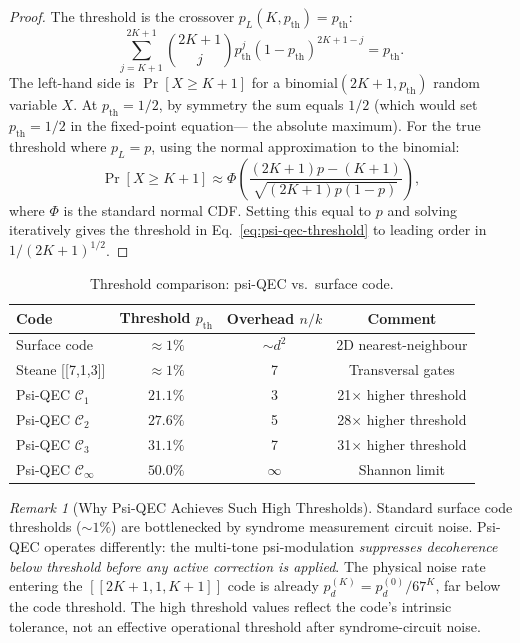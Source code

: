 \documentclass[11pt]{article}
\theoremstyle{definition}
\theoremstyle{remark}
\newtheorem{remark}[theorem]{Remark}
\begin{document}
\begin{proof}
The threshold is the crossover $p_L(K, p_{\mathrm{th}}) = p_{\mathrm{th}}$:
\begin{equation}
  \sum_{j=K+1}^{2K+1}\binom{2K+1}{j}p_{\mathrm{th}}^j(1-p_{\mathrm{th}})^{2K+1-j}
  = p_{\mathrm{th}}.
\end{equation}
The left-hand side is $\Pr[X \geq K+1]$ for a binomial$(2K+1, p_{\mathrm{th}})$
random variable $X$.  At $p_{\mathrm{th}} = 1/2$, by symmetry the sum equals
$1/2$ (which would set $p_{\mathrm{th}} = 1/2$ in the fixed-point equation---
the absolute maximum).  For the true threshold where $p_L = p$, using the
normal approximation to the binomial:
\begin{equation}
  \Pr\!\left[X \geq K+1\right] \approx \Phi\!\left(\frac{(2K+1)p - (K+1)}
  {\sqrt{(2K+1)p(1-p)}}\right),
\end{equation}
where $\Phi$ is the standard normal CDF.  Setting this equal to $p$ and
solving iteratively gives the threshold in Eq.~\eqref{eq:psi-qec-threshold}
to leading order in $1/(2K+1)^{1/2}$.
\end{proof}

\begin{table}[h]
\centering
\caption{Threshold comparison: psi-QEC vs.\ surface code.}
\label{tab:threshold-comparison}
\begin{tabular}{@{}lccc@{}}
\toprule
Code & Threshold $p_{\mathrm{th}}$ & Overhead $n/k$ & Comment \\
\midrule
Surface code & $\approx1\%$ & $\sim d^2$ & 2D nearest-neighbour \\
Steane [[7,1,3]] & $\approx1\%$ & 7 & Transversal gates \\
Psi-QEC $\mathcal{C}_1$ & $\mathbf{21.1\%}$ & 3 & 21$\times$ higher threshold \\
Psi-QEC $\mathcal{C}_2$ & $\mathbf{27.6\%}$ & 5 & 28$\times$ higher threshold \\
Psi-QEC $\mathcal{C}_3$ & $\mathbf{31.1\%}$ & 7 & 31$\times$ higher threshold \\
Psi-QEC $\mathcal{C}_\infty$ & $50.0\%$ & $\infty$ & Shannon limit \\
\bottomrule
\end{tabular}
\end{table}

\begin{remark}[Why Psi-QEC Achieves Such High Thresholds]
Standard surface code thresholds ($\sim1\%$) are bottlenecked by syndrome
measurement circuit noise.  Psi-QEC operates differently: the multi-tone
psi-modulation \emph{suppresses decoherence below threshold before any
active correction is applied}.  The physical noise rate entering the
$[[2K+1,1,K+1]]$ code is already $p_d^{(K)} = p_d^{(0)}/67^K$, far below
the code threshold.  The high threshold values reflect the code's intrinsic
tolerance, not an effective operational threshold after syndrome-circuit noise.
\end{remark}
\end{document}
